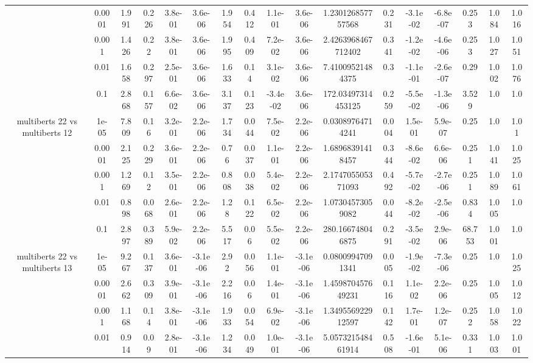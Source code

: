 \begin{tabular}{|c|c|c|c|c|c|c|c|c|c|c|c|c|c|c|c|c|}
 & 0.0001 & 1.991 & 0.226 & 3.8e-01 & 3.6e-06 & 1.954 & 0.412 & 1.1e-01 & 3.6e-06 & 1.230126857757568 & 0.231 & -3.1e-02 & -6.8e-07 & 0.253 & 1.084 & 1.016 \\
 & 0.001 & 1.426 & 0.22 & 3.8e-01 & 3.6e-06 & 1.995 & 0.409 & 7.2e-02 & 3.6e-06 & 2.4263968467712402 & 0.341 & -1.2e-02 & -4.6e-06 & 0.253 & 1.027 & 1.051 \\
 & 0.01 & 1.658 & 0.297 & 2.5e-01 & 3.6e-06 & 1.633 & 0.14 & 3.1e-02 & 3.6e-06 & 7.41009521484375 & 0.3 & -1.1e-01 & -2.6e-07 & 0.29 & 1.002 & 1.076 \\
 & 0.1 & 2.868 & 0.157 & 6.6e-02 & 3.6e-06 & 3.137 & 0.123 & -3.4e-02 & 3.6e-06 & 172.03497314453125 & 0.259 & -5.5e-02 & -1.3e-06 & 3.529 & 1.0 & 1.0 \\
\hline
\multirow{5}{*}{multiberts 22 vs multiberts 12} & 1e-05 & 7.809 & 0.16 & 3.2e-01 & 2.2e-06 & 1.734 & 0.044 & 7.5e-02 & 2.2e-06 & 0.03089764714241 & 0.004 & 1.5e-01 & 5.9e-07 & 0.25 & 1.0 & 1.01 \\
 & 0.0001 & 2.125 & 0.229 & 3.6e-01 & 2.2e-06 & 0.76 & 0.037 & 1.1e-01 & 2.2e-06 & 1.68968391418457 & 0.344 & -8.6e-02 & 6.6e-06 & 0.251 & 1.041 & 1.025 \\
 & 0.001 & 1.269 & 0.12 & 3.5e-01 & 2.2e-06 & 0.808 & 0.038 & 5.4e-02 & 2.2e-06 & 2.174705505371093 & 0.492 & -5.7e-02 & -2.7e-06 & 0.251 & 1.089 & 1.061 \\
 & 0.01 & 0.898 & 0.068 & 2.6e-01 & 2.2e-06 & 1.28 & 0.122 & 6.5e-02 & 2.2e-06 & 1.07304573059082 & 0.044 & -8.2e-02 & -2.5e-06 & 0.834 & 1.005 & 1.0 \\
 & 0.1 & 2.897 & 0.389 & 5.9e-02 & 2.2e-06 & 5.517 & 0.06 & 5.5e-02 & 2.2e-06 & 280.166748046875 & 0.291 & -3.5e-02 & 2.9e-06 & 68.753 & 1.001 & 1.0 \\
\hline
\multirow{5}{*}{multiberts 22 vs multiberts 13} & 1e-05 & 9.267 & 0.137 & 3.6e-01 & -3.1e-06 & 2.92 & 0.056 & 1.1e-01 & -3.1e-06 & 0.08009947091341 & 0.005 & -1.9e-02 & -7.3e-06 & 0.25 & 1.0 & 1.025 \\
 & 0.0001 & 2.662 & 0.309 & 3.9e-01 & -3.1e-06 & 2.216 & 0.06 & 1.4e-01 & -3.1e-06 & 1.459870457649231 & 0.116 & 1.1e-02 & 2.2e-06 & 0.25 & 1.005 & 1.012 \\
 & 0.001 & 1.168 & 0.14 & 3.8e-01 & -3.1e-06 & 1.933 & 0.054 & 6.9e-02 & -3.1e-06 & 1.349556922912597 & 0.142 & 1.7e-01 & 1.2e-07 & 0.252 & 1.058 & 1.022 \\
 & 0.01 & 0.914 & 0.09 & 2.8e-01 & -3.1e-06 & 1.234 & 0.049 & 1.0e-01 & -3.1e-06 & 5.057321548461914 & 0.508 & -1.6e-01 & 5.1e-06 & 0.331 & 1.003 & 1.001 \\

\end{tabular}

